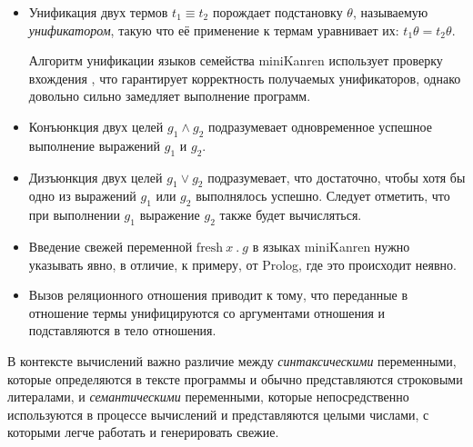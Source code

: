 \begin{itemize}
\item Унификация двух термов $t_1 \equiv t_2$ порождает подстановку $\theta$, называемую \emph{унификатором},
      такую что её применение к термам уравнивает их: $t_1 \theta = t_2 \theta$.

      Алгоритм унификации языков семейства miniKanren использует проверку вхождения ,
      что гарантирует корректность получаемых унификаторов, однако довольно сильно замедляет выполнение программ.

\item Конъюнкция двух целей $g_1 \land g_2$ подразумевает одновременное успешное выполнение выражений $g_1$ и $g_2$.
\item Дизъюнкция двух целей $g_1 \lor g_2$ подразумевает, что достаточно, чтобы хотя бы одно из выражений $g_1$ или $g_2$ выполнялось успешно.
      Следует отметить, что при выполнении $g_1$ выражение $g_2$ также будет вычисляться.
\item Введение свежей переменной $\text{fresh}\ x\ .\ g$ в языках miniKanren нужно указывать явно, в отличие, к примеру,
      от Prolog, где это происходит неявно.
\item Вызов реляционного отношения приводит к тому, что переданные в отношение термы
      унифицируются со аргументами отношения и подставляются в тело отношения. 
\end{itemize}

В контексте вычислений важно различие между \emph{синтаксическими} переменными, которые
определяются в тексте программы и обычно представляются строковыми литералами, и
\emph{семантическими} переменными, которые непосредственно используются в процессе вычислений и
представляются целыми числами, с которыми легче работать и генерировать свежие.

